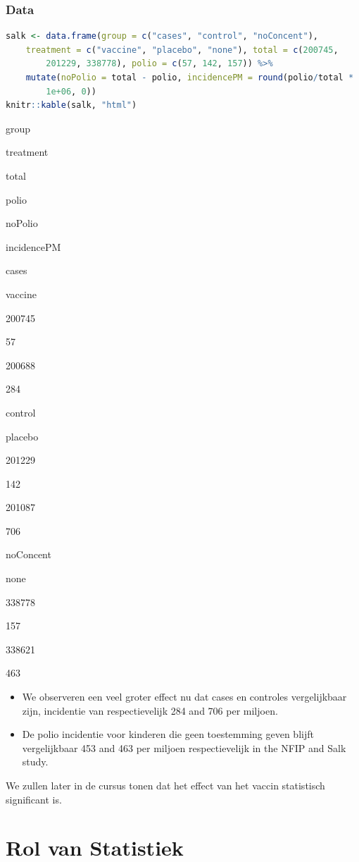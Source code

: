 \documentclass[
  12pt,dutch,coursenotes]{book}
\begin{document}
\hypertarget{data-1}{%
\subsubsection{Data}\label{data-1}}

\begin{lstlisting}[language=R]
salk <- data.frame(group = c("cases", "control", "noConcent"),
    treatment = c("vaccine", "placebo", "none"), total = c(200745,
        201229, 338778), polio = c(57, 142, 157)) %>%
    mutate(noPolio = total - polio, incidencePM = round(polio/total *
        1e+06, 0))
knitr::kable(salk, "html")
\end{lstlisting}

group

treatment

total

polio

noPolio

incidencePM

cases

vaccine

200745

57

200688

284

control

placebo

201229

142

201087

706

noConcent

none

338778

157

338621

463

\begin{itemize}
\item
  We observeren een veel groter effect nu dat cases en controles vergelijkbaar zijn, incidentie van respectievelijk 284 and 706 per miljoen.
\item
  De polio incidentie voor kinderen die geen toestemming geven blijft vergelijkbaar 453 and 463 per miljoen respectievelijk in the NFIP and Salk study.
\end{itemize}

We zullen later in de cursus tonen dat het effect van het vaccin statistisch significant is.

\hypertarget{rol-van-statistiek}{%
\section{Rol van Statistiek}\label{rol-van-statistiek}}
\end{document}
